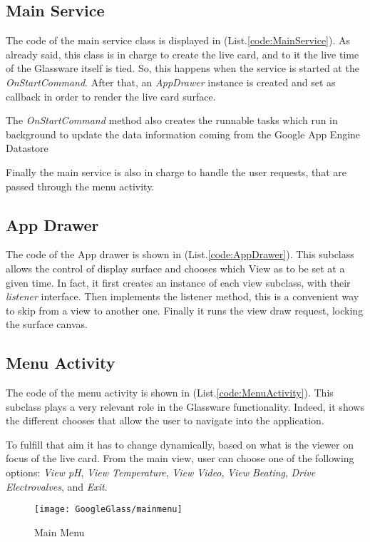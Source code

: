\subsection{Main Service}

The code of the main service class is displayed in (List.\ref{code:MainService}). As already said, this class is in charge to create the live card, and to it the live time of the Glassware itself is tied. So, this happens when the service is started at the \textit{OnStartCommand}. After that, an \textit{AppDrawer} instance is created and set as callback in order to render the live card surface.

The \textit{OnStartCommand} method also creates the runnable tasks which run in background to update the data information coming from the Google App Engine Datastore

Finally the main service is also in charge to handle the user requests, that are passed through the menu activity.

\subsection{App Drawer}

The code of the App drawer is shown in (List.\ref{code:AppDrawer}). This subclass allows the control of display surface and chooses which View as to be set at a given time. In fact, it first creates an instance of each view subclass, with their \textit{listener} interface. Then implements the listener method, this is a convenient way to skip from a view to another one. Finally it runs the view draw request, locking the surface canvas.

\subsection{Menu Activity}
The code of the menu activity is shown in (List.\ref{code:MenuActivity}). This subclass plays a very relevant role in the  Glassware functionality. Indeed, it shows the different chooses that allow the user to navigate into the application.

To fulfill that aim it has to change dynamically, based on what is the viewer on focus of the live card. From the main view, user can choose one of the following options: \textit{View pH}, \textit{View Temperature}, \textit{View Video}, \textit{View Beating}, \textit{Drive Electrovalves}, and \textit{Exit}.

\begin{figure}[h]
	\centering
	\texttt{[image: GoogleGlass/mainmenu]}
	\caption{Main Menu}
	\label{Fig:mainmenu}
	\hfill
\end{figure}

